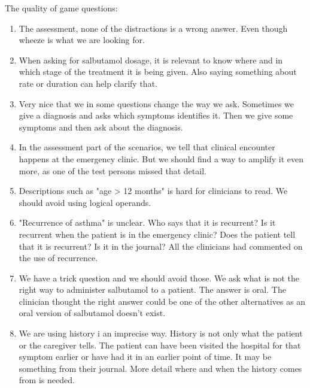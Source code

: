 The quality of game questions:
\begin{enumerate}
	\item The assessment, none of the distractions is a wrong answer. Even though wheeze is what we are looking for.
	\item When asking for salbutamol dosage, it is relevant to know where and in which stage of the treatment it is being given. Also saying something about rate or duration can help clarify that.
	\item Very nice that we in some questions change the way we ask. Sometimes we give a diagnosis and asks which symptoms identifies it. Then we give some symptoms and then ask about the diagnosis.
	\item In the assessment part of the scenarios, we tell that clinical encounter happens at the emergency clinic. But we should find a way to amplify it even more, as one of the test persons missed that detail.
	\item Descriptions such as "age > 12 months" is hard for clinicians to read. We should avoid using logical operands.
	\item "Recurrence of asthma" is unclear. Who says that it is recurrent? Is it recurrent when the patient is in the emergency clinic? Does the patient tell that it is recurrent? Is it in the journal? All the clinicians had commented on the use of recurrence.
	\item We have a trick question and we should avoid those. We ask what is not the right way to administer salbutamol to a patient. The answer is oral. The clinician thought the right answer could be one of the other alternatives as an oral version of salbutamol doesn't exist.
	\item We are using history i an imprecise way. History is not only what the patient or the caregiver tells. The patient can have been visited the hospital for that symptom earlier or have had it in an earlier point of time. It may be something from their journal. More detail where and when the history comes from is needed. 
\end{enumerate}

